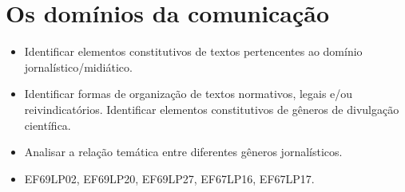 \chapter{Os domínios da comunicação}


\begin{itemize}

  \item Identificar elementos constitutivos de textos pertencentes ao
domínio jornalístico/midiático.

  \item Identificar formas de organização de textos normativos, legais e/ou
reivindicatórios. Identificar elementos constitutivos de gêneros de
divulgação científica.

  \item Analisar a relação temática entre diferentes gêneros jornalísticos.

\end{itemize}


\begin{itemize}
  
  \item EF69LP02, EF69LP20, EF69LP27, EF67LP16, EF67LP17.

\end{itemize}

